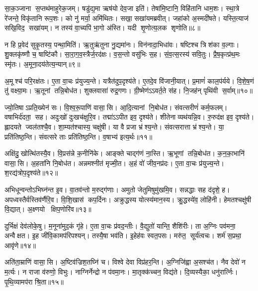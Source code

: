 सा॒क॒ञ्जाना स॒प्तथ॑माहुरेक॒जम्‌। षडु॑द्य॒मा ऋष॑यो देव॒जा इति॑। 
तेषा॑मि॒ष्टानि॒ विहि॑तानि धाम॒शः। स्था॒त्रे रे॑जन्ते॒ विकृ॑तानि रूप॒शः। 
को नु॑ मर्या॒ अमि॑थितः। सखा॒ सखा॑यमब्रवीत्‌। 
जहा॑को अ॒स्मदी॑षते। यस्ति॒त्याज॑ सखि॒विद॒ सखा॑यम्‌। 
न तस्य॑ वा॒च्यपि॑ भा॒गो अ॑स्ति। यदी शृ॒णोत्य॒लक शृणोति॥८॥

न हि प्र॒वेद॑ सुकृ॒तस्य॒ पन्था॒मिति॑। ऋ॒तु\ur{}ऋ॑तुना नु॒द्यमा॑नः। 
विन॑नादा॒भिधा॑वः। षष्टिश्च त्रिश॑का व॒ल्गाः। 
शु॒क्लकृ॑ष्णौ च॒ षाष्टि॑कौ। सा॒रा॒ग॒व॒स्त्रैर्ज॒रद॑क्षः। 
व॒स॒न्तो वसु॑भिः स॒ह। सं॒व॒त्स॒रस्य॑ सवि॒तुः। 
प्रै॒ष॒कृत्प्र॑थ॒मः स्मृ॑तः। अ॒मूना॒दय॑तेत्य॒न्यान्‌॥९॥

अ॒मूश्च॑ परि॒रक्ष॑तः। ए॒ता वा॒चः प्र॑युज्य॒न्ते। 
यत्रैत॑दुप॒दृश्य॑ते। ए॒तदे॒व वि॑जानी॒यात्। 
प्र॒माणं॑ काल॒प॑र्यये। वि॒शे॒ष॒णं तु॑ वक्ष्या॒मः। 
ऋ॒तूनां तन्नि॒बोध॑त। शुक्लवासा॑ रुद्र॒गणः। 
ग्री॒ष्मेण॑ऽऽवर्त॒ते स॑ह। नि॒जह॑न्‌ पृथि॑वी स॒र्वाम्‌॥१०॥

ज्यो॒तिषाऽप्रति॒ख्येन॑ सः। वि॒श्व॒रू॒पाणि॑ वासा॒सि। 
आ॒दि॒त्यानां नि॒बोध॑त। संवत्सरीणं॑ कर्म॒फलम्‌। 
व\ur{}षाभिर्द॑दता॒ सह। अदुःखो॑ दुःखच॑क्षुरि॒व। 
तद्मा॑ऽऽपीत इव॒ दृश्य॑ते। शीतेनाव्यथ॑यन्नि॒व। 
रु॒रुद॑क्ष इव॒ दृश्य॑ते। ह्लादयते ज्वल॑तश्चै॒व। 
शा॒म्यत॑श्चास्य॒ चक्षु॑षी। या वै प्रजा भ्र॑श्य॒न्ते। 
संवत्सरात्ता भ्र॑श्य॒न्ते। या॒ प्रति॑तिष्ठ॒न्ति। 
संवत्सरे ताः प्रति॑तिष्ठ॒न्ति। व॒\ar{}षाभ्य॑ इत्य॒र्थः॥११॥\anuvakamend


अक्षि॑दु॒खोत्थि॑तस्यै॒व। वि॒प्रस॑न्ने क॒नीनि॑के। 
आङ्क्ते चाद्ग॑णं ना॒स्ति। ऋ॒भूणां तन्नि॒बोध॑त। 
क॒न॒का॒भानि॑ वासा॒सि। अ॒हता॑नि नि॒बोध॑त। 
अन्नमश्नीत॑ मृज्मी॒त। अ॒हं वो॑ जीव॒नप्र॑दः। 
ए॒ता वा॒चः प्र॑युज्य॒न्ते। श॒रद्य॑त्रोप॒दृश्य॑ते॥१२॥

अभिधून्वन्तोऽभिघ्न॑न्त इ॒व। वा॒तव॑न्तो म॒रुद्ग॑णाः। 
अमुतो जेतुमिषुमु॑खमि॒व। सन्नद्धाः सह द॑दृशे॒ ह। 
अपध्वस्तैर्वस्तिव॑र्णैरि॒व। वि॒शि॒खास॑ कप॒र्दिनः। 
अक्रुद्धस्य योत्स्य॑मान॒स्य। क्रु॒द्धस्ये॑व॒ लोहि॑नी। 
हेमतश्चक्षु॑षी वि॒द्यात्‌। अ॒क्ष्णयो क्षिप॒णोरि॑व॥१३॥

दुर्भिक्षं देव॑लोके॒षु। म॒नूना॑मुद॒कं गृ॑हे। 
ए॒ता वा॒चः प्र॑वद॒न्तीः। वै॒द्युतो॑ यान्ति॒ शैशि॑रीः। 
ता अ॒ग्निः पव॑मना॒ अन्वैक्षत। इ॒ह जी॑वि॒कामप॑रिपश्यन्‌। 
तस्यै॒षा भव॑ति। इ॒हेह॑वः स्वत॒पसः। 
मरु॑त॒ सूर्य॑त्वचः। शर्म॑ स॒प्रथा॒ आवृ॑णे॥१४॥\anuvakamend


अति॑ता॒म्राणि॑ वासा॒सि। अ॒ष्टिव॑ज्रिश॒तघ्नि॑ च। 
विश्वे देवा विप्र॑हर॒न्ति। अ॒ग्निजि॑ह्वा अ॒सश्च॑त। 
नैव देवो॑ न म॒र्त्यः। न राजा व॑रुणो॒ विभुः। 
नाग्निर्नेन्द्रो न प॑वमा॒नः। मा॒तृक्क॑च्चन॒ विद्य॑ते। 
दि॒व्यस्यैका॒ धनु॑रार्त्निः। पृ॒थि॒व्यामप॑रा श्रि॒ता॥१५॥

